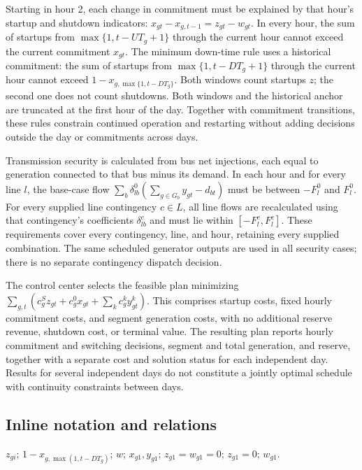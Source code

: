 \documentclass[10pt]{article}
\begin{document}
Starting in hour 2, each change in commitment must be explained by that hour's startup and shutdown indicators: \(x_{gt}-x_{g,t-1}=z_{gt}-w_{gt}\). In every hour, the sum of startups from \(\max\{1,t-UT_g+1\}\) through the current hour cannot exceed the current commitment \(x_{gt}\). The minimum down-time rule uses a historical commitment: the sum of startups from \(\max\{1,t-DT_g+1\}\) through the current hour cannot exceed \(1-x_{g,\max\{1,t-DT_g\}}\). Both windows count startups \(z\); the second one does not count shutdowns. Both windows and the historical anchor are truncated at the first hour of the day. Together with commitment transitions, these rules constrain continued operation and restarting without adding decisions outside the day or commitments across days.

Transmission security is calculated from bus net injections, each equal to generation connected to that bus minus its demand. In each hour and for every line \(l\), the base-case flow \(\sum_b\delta^0_{lb}(\sum_{g\in G_b}y_{gt}-d_{bt})\) must be between \(-F_l^0\) and \(F_l^0\). For every supplied line contingency \(c\in L\), all line flows are recalculated using that contingency's coefficients \(\delta^c_{lb}\) and must lie within \([-F_l^c,F_l^c]\). These requirements cover every contingency, line, and hour, retaining every supplied combination. The same scheduled generator outputs are used in all security cases; there is no separate contingency dispatch decision.

The control center selects the feasible plan minimizing \(\sum_{g,t}(c_g^S z_{gt}+c_g^0x_{gt}+\sum_k c_g^k y^k_{gt})\). This comprises startup costs, fixed hourly commitment costs, and segment generation costs, with no additional reserve revenue, shutdown cost, or terminal value. The resulting plan reports hourly commitment and switching decisions, segment and total generation, and reserve, together with a separate cost and solution status for each independent day. Results for several independent days do not constitute a jointly optimal schedule with continuity constraints between days.

\subsection*{Inline notation and relations}
$z_{gi}$; $1-x_{g,\max(1,t-DT_g)}$; $w$; $x_{g1},y_{g1}$; $z_{g1}=w_{g1}=0$; $z_{g1}=0$; $w_{g1}$.
\end{document}
